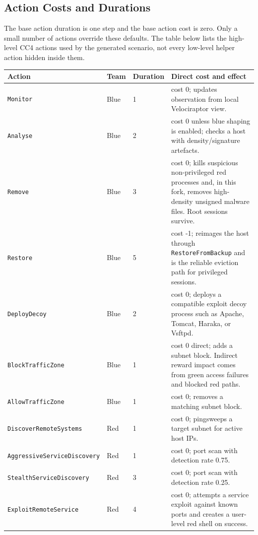 \subsection{Action Costs and Durations}

The base action duration is one step and the base action cost is zero. Only a
small number of actions override these defaults. The table below lists the
high-level CC4 actions used by the generated scenario, not every low-level
helper action hidden inside them.

\begin{longtable}{p{}p{}p{}p{}}
\toprule
\textbf{Action} & \textbf{Team} & \textbf{Duration} & \textbf{Direct cost and effect} \\
\midrule
\texttt{Monitor} & Blue & 1 & cost 0; updates observation from local Velociraptor view. \\
\texttt{Analyse} & Blue & 2 & cost 0 unless blue shaping is enabled; checks a host with density/signature artefacts. \\
\texttt{Remove} & Blue & 3 & cost 0; kills suspicious non-privileged red processes and, in this fork, removes high-density unsigned malware files. Root sessions survive. \\
\texttt{Restore} & Blue & 5 & cost -1; reimages the host through \texttt{RestoreFromBackup} and is the reliable eviction path for privileged sessions. \\
\texttt{DeployDecoy} & Blue & 2 & cost 0; deploys a compatible exploit decoy process such as Apache, Tomcat, Haraka, or Vsftpd. \\
\texttt{BlockTrafficZone} & Blue & 1 & cost 0 direct; adds a subnet block. Indirect reward impact comes from green access failures and blocked red paths. \\
\texttt{AllowTrafficZone} & Blue & 1 & cost 0; removes a matching subnet block. \\
\texttt{DiscoverRemoteSystems} & Red & 1 & cost 0; pingsweeps a target subnet for active host IPs. \\
\texttt{AggressiveServiceDiscovery} & Red & 1 & cost 0; port scan with detection rate 0.75. \\
\texttt{StealthServiceDiscovery} & Red & 3 & cost 0; port scan with detection rate 0.25. \\
\texttt{ExploitRemoteService} & Red & 4 & cost 0; attempts a service exploit against known ports and creates a user-level red shell on success. \\

\end{longtable}
